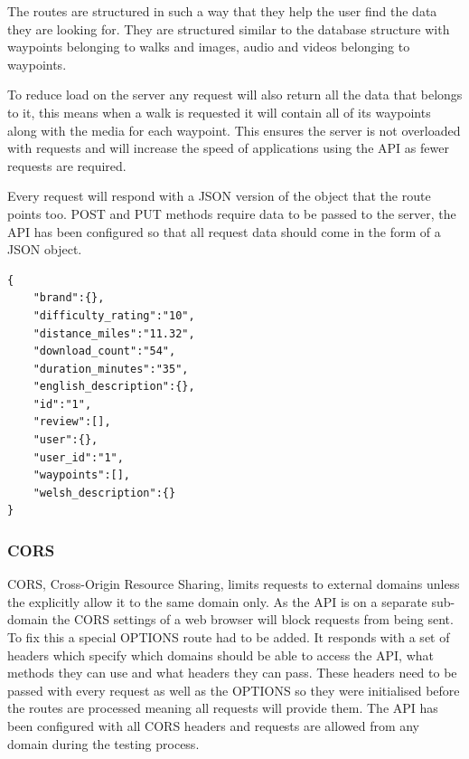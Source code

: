 \documentclass[11pt,a4paper]{article}
\begin{document}
The routes are structured in such a way that they help the user find the data they are looking for. They are structured similar to the database structure with waypoints belonging to walks and images, audio and videos belonging to waypoints.

To reduce load on the server any request will also return all the data that belongs to it, this means when a walk is requested it will contain all of its waypoints along with the media for each waypoint. This ensures the server is not overloaded with requests and will increase the speed of applications using the API as fewer requests are required.

Every request will respond with a JSON version of the object that the route points too. POST and PUT methods require data to be passed to the server, the API has been configured so that all request data should come in the form of a JSON object.


\begin{lstlisting}[captionpos=b, caption=JSON Return data from /walks/1, label=lst:model, frame=single]
{
	"brand":{},
	"difficulty_rating":"10",
	"distance_miles":"11.32",
	"download_count":"54",
	"duration_minutes":"35",
	"english_description":{},
	"id":"1",
	"review":[],
	"user":{},
	"user_id":"1",
	"waypoints":[],
	"welsh_description":{}
}
\end{lstlisting}

\subsubsection{CORS}
CORS, Cross-Origin Resource Sharing, limits requests to external domains unless the explicitly allow it to the same domain only. As the API is on a separate sub-domain the CORS settings of a web browser will block requests from being sent. To fix this a special OPTIONS route had to be added. It responds with a set of headers which specify which domains should be able to access the API, what methods they can use and what headers they can pass. These headers need to be passed with every request as well as the OPTIONS so they were initialised before the routes are processed meaning all requests will provide them. The API has been configured with all CORS headers and requests are allowed from any domain during the testing process.
\end{document}
